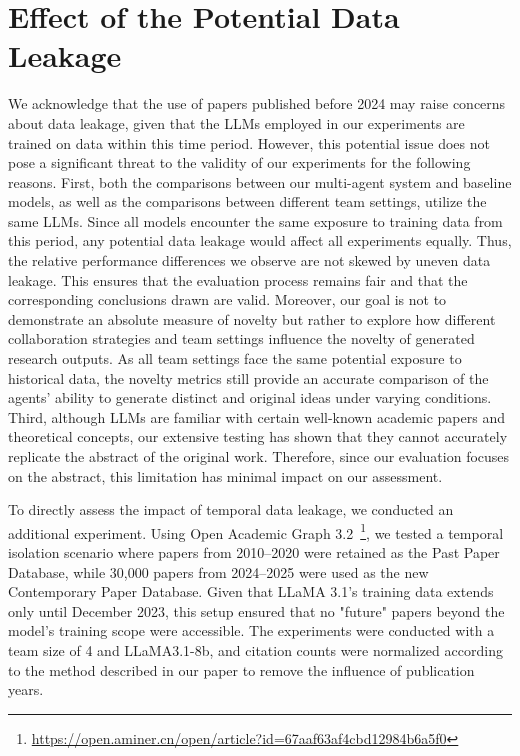 \documentclass[11pt]{article}
\begin{document}
\section{Effect of the Potential Data Leakage} \label{appx:data_leakage}
We acknowledge that the use of papers published before 2024 may raise concerns about data leakage, given that the LLMs employed in our experiments are trained on data within this time period. However, this potential issue does not pose a significant threat to the validity of our experiments for the following reasons.
First, both the comparisons between our multi-agent system and baseline models, as well as the comparisons between different team settings, utilize the same LLMs. Since all models encounter the same exposure to training data from this period, any potential data leakage would affect all experiments equally. Thus, the relative performance differences we observe are not skewed by uneven data leakage. This ensures that the evaluation process remains fair and that the corresponding conclusions drawn are valid.
Moreover, our goal is not to demonstrate an absolute measure of novelty but rather to explore how different collaboration strategies and team settings influence the novelty of generated research outputs. As all team settings face the same potential exposure to historical data, the novelty metrics still provide an accurate comparison of the agents' ability to generate distinct and original ideas under varying conditions. Third, although LLMs are familiar with certain well-known academic papers and theoretical concepts, our extensive testing has shown that they cannot accurately replicate the abstract of the original work. Therefore, since our evaluation focuses on the abstract, this limitation has minimal impact on our assessment.

To directly assess the impact of temporal data leakage, we conducted an additional experiment. Using Open Academic Graph 3.2~\footnote{\url{https://open.aminer.cn/open/article?id=67aaf63af4cbd12984b6a5f0}}, we tested a temporal isolation scenario where papers from 2010–2020 were retained as the Past Paper Database, while 30,000 papers from 2024–2025 were used as the new Contemporary Paper Database. Given that LLaMA 3.1's training data extends only until December 2023, this setup ensured that no "future" papers beyond the model’s training scope were accessible. The experiments were conducted with a team size of 4 and LLaMA3.1-8b, and citation counts were normalized according to the method described in our paper to remove the influence of publication years.
\end{document}
